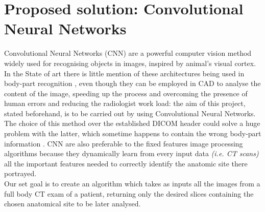 \documentclass[../main.tex]{subfiles}
\begin{document}
\section{Proposed solution: Convolutional Neural Networks}
Convolutional Neural Networks (CNN) are  a powerful computer vision method widely used for recognising objects in images, inspired by animal's visual cortex. In the State of art there is little mention of these architectures being used in body-part recognition \cite{Wang}, even though they can be employed in CAD to analyse the content of the image, speeding up the process and overcoming the presence of human errors and reducing the radiologist work load: the aim of this project, stated beforehand, is to be carried out by using Convolutional Neural Networks. The choice of this method over the established DICOM header could solve a huge problem with the latter, which sometime happens to contain the wrong body-part information \cite{Yan2016}. CNN are also preferable to the fixed features image processing algorithms because they dynamically learn from every input data \textit{(i.e. CT scans)} all the important features needed to correctly identify the anatomic site there portrayed. \\ 
Our set goal is to create an algorithm which takes as inputs all the images from a full body CT exam of a patient, returning only the desired slices containing the chosen anatomical site to be later analysed. \\ 

\end{document}
